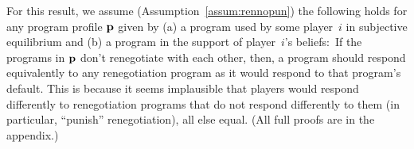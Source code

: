 \documentclass[sigconf]{aamas}
\theoremstyle{definition}
\begin{document}
For this result, we assume 
(Assumption~\ref{assum:rennopun})
the following holds 
for any program profile $\textbf{p}$
given by (a) a program used by some player~$i$ in subjective
equilibrium and (b) a program
in the support of player~$i$'s beliefs:\
If the programs in $\textbf{p}$ don't
renegotiate with each other, then,
a program should respond equivalently to
any renegotiation program as it
would respond
to that program's default.
This is because it seems implausible
that players would
respond
differently to renegotiation programs
that do not respond differently to them
(in particular, 
``punish'' renegotiation), all else equal.
(All full proofs are
in the appendix.)
\end{document}
